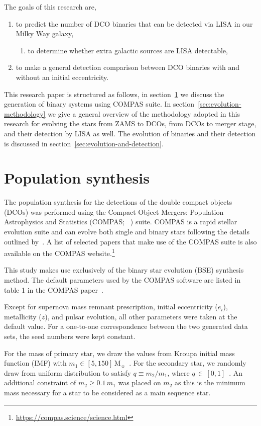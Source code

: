 \documentclass[twocolumn, twocolappendix]{aastex63}
\begin{document}
The goals of this research are,
\begin{enumerate}%
	\item to predict the number of DCO binaries that can be detected via LISA in our Milky Way galaxy,
	\begin{enumerate}
		\item to determine whether extra galactic sources are LISA detectable,
	\end{enumerate}
	\item to make a general detection comparison between DCO binaries with and without an initial eccentricity.
\end{enumerate}%

This research paper is structured as follows, in section~\ref{sec:population_synthesis} we discuss the generation of binary systems using COMPAS suite.
In section~\ref{sec:evolution-methodology} we give a general overview of the methodology adopted in this research for evolving the stars from ZAMS to DCOs, from DCOs to merger stage, and their detection by LISA as well.
The evolution of binaries and their detection is discussed in section~\ref{sec:evolution-and-detection}.

    \section{Population synthesis}
\label{sec:population_synthesis}
The population synthesis for the detections of the double compact objects (DCOs) was performed using the Compact Object Mergers: Population Astrophysics and Statistics (COMPAS; ~\cite{Stevenson2017, Vigna2018, Riley2022}) suite.
COMPAS is a rapid stellar evolution suite and can evolve both single and binary stars following the details outlined by~\citet{Hurley2000, Hurley2002}.
A list of selected papers that make use of the COMPAS suite is also available on the COMPAS website.\footnote{\url{https://compas.science/science.html}}

This study makes use exclusively of the binary star evolution (BSE) synthesis method.
The default parameters used by the COMPAS software are listed in table 1 in the COMPAS paper~\citep{Riley2022}.

Except for supernova mass remnant prescription, initial eccentricity ($e_i$), metallicity ($z$), and pulsar evolution, all other parameters were taken at the default value.
For a one-to-one correspondence between the two generated data sets, the seed numbers were kept constant.

For the mass of primary star, we draw the values from Kroupa initial mass function (IMF) with $m_1 \in [5, 150]\,\text{M}_\sun$~\citep{Kroupa2001}.
For the secondary star, we randomly draw from uniform distribution to satisfy $q\equiv m_2/m_1$, where $q\,\in\,[0, 1]$~\citep{Sana2012}.
An additional constraint of $m_2 \geq 0.1\,m_1$ was placed on $m_2$ as this is the minimum mass necessary for a star to be considered as a main sequence star.
\end{document}
